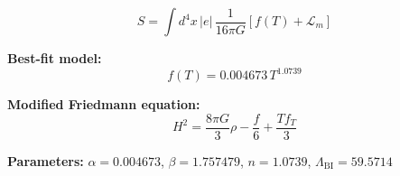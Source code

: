 
\begin{equation}
  S = \int d^4x \, |e| \, \frac{1}{16\pi G} \left[ f(T) + \mathcal{L}_m \right]
\end{equation}

\textbf{Best-fit model:}
\begin{equation}
  f(T) = 0.004673 \, T^{1.0739}
\end{equation}

\textbf{Modified Friedmann equation:}
\begin{equation}
  H^2 = \frac{8\pi G}{3} \rho - \frac{f}{6} + \frac{T f_T}{3}
\end{equation}

\textbf{Parameters:}
$\alpha = 0.004673$, \quad
$\beta = 1.757479$, \quad
$n = 1.0739$, \quad
$\Lambda_{\text{BI}} = 59.5714$